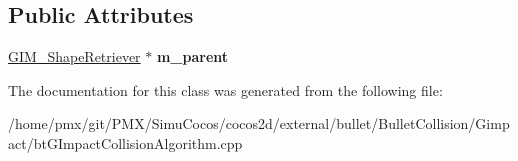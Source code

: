 \subsection*{Public Attributes}
\begin{DoxyCompactItemize}
\item 
\mbox{\label{classGIM__ShapeRetriever_1_1ChildShapeRetriever_a9348822849ba8c562aa4240ef5132a99}} 
\hyperlink{classGIM__ShapeRetriever}{G\+I\+M\+\_\+\+Shape\+Retriever} $\ast$ {\bfseries m\+\_\+parent}
\end{DoxyCompactItemize}


The documentation for this class was generated from the following file\+:\begin{DoxyCompactItemize}
\item 
/home/pmx/git/\+P\+M\+X/\+Simu\+Cocos/cocos2d/external/bullet/\+Bullet\+Collision/\+Gimpact/bt\+G\+Impact\+Collision\+Algorithm.\+cpp\end{DoxyCompactItemize}
